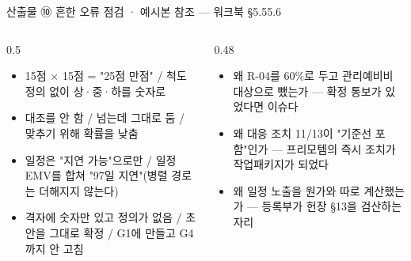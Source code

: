 \begin{frame}{산출물 ⑩ 흔한 오류 점검 · 예시본 참조 — 워크북 §5.5\til{}5.6}
\begin{columns}[T]
\begin{column}{0.5\textwidth}
\begin{itemize}
\item 1\til{}5점 × 1\til{}5점 = "25점 만점" / 척도 정의 없이 상·중·하를 숫자로
\item 대조를 안 함 / 넘는데 그대로 둠 / 맞추기 위해 확률을 낮춤
\item 일정은 "지연 가능"으로만 / 일정 EMV를 합쳐 "97일 지연"(병렬 경로는 더해지지 않는다)
\item 격자에 숫자만 있고 정의가 없음 / 초안을 그대로 확정 / G1에 만들고 G4까지 안 고침
\end{itemize}
\end{column}
\begin{column}{0.48\textwidth}
\begin{itemize}
\item 왜 R-04를 60\%로 두고 관리예비비 대상으로 뺐는가 — 확정 통보가 있었다면 이슈다
\item 왜 대응 조치 11/13이 "기준선 포함"인가 — 프리모템의 즉시 조치가 작업패키지가 되었다
\item 왜 일정 노출을 원가와 따로 계산했는가 — 등록부가 헌장 §13을 검산하는 자리
\end{itemize}
\end{column}
\end{columns}
\end{frame}

